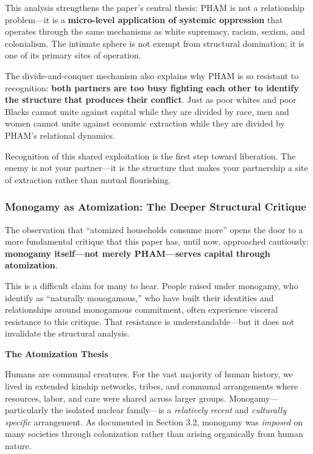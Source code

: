 \documentclass[12pt, letterpaper]{article}
\begin{document}
This analysis strengthens the paper's central thesis: PHAM is not a relationship problem---it is a \textbf{micro-level application of systemic oppression} that operates through the same mechanisms as white supremacy, racism, sexism, and colonialism. The intimate sphere is not exempt from structural domination; it is one of its primary sites of operation.

The divide-and-conquer mechanism also explains why PHAM is so resistant to recognition: \textbf{both partners are too busy fighting each other to identify the structure that produces their conflict}. Just as poor whites and poor Blacks cannot unite against capital while they are divided by race, men and women cannot unite against economic extraction while they are divided by PHAM's relational dynamics.

Recognition of this shared exploitation is the first step toward liberation. The enemy is not your partner---it is the structure that makes your partnership a site of extraction rather than mutual flourishing.

\subsubsection{Monogamy as Atomization: The Deeper Structural Critique}

The observation that ``atomized households consume more'' opens the door to a more fundamental critique that this paper has, until now, approached cautiously: \textbf{monogamy itself---not merely PHAM---serves capital through atomization}.

This is a difficult claim for many to hear. People raised under monogamy, who identify as ``naturally monogamous,'' who have built their identities and relationships around monogamous commitment, often experience visceral resistance to this critique. That resistance is understandable---but it does not invalidate the structural analysis.

\textbf{The Atomization Thesis}

Humans are communal creatures. For the vast majority of human history, we lived in extended kinship networks, tribes, and communal arrangements where resources, labor, and care were shared across larger groups. Monogamy---particularly the isolated nuclear family---is a \textit{relatively recent} and \textit{culturally specific} arrangement. As documented in Section 3.2, monogamy was \textit{imposed} on many societies through colonization rather than arising organically from human nature.
\end{document}
